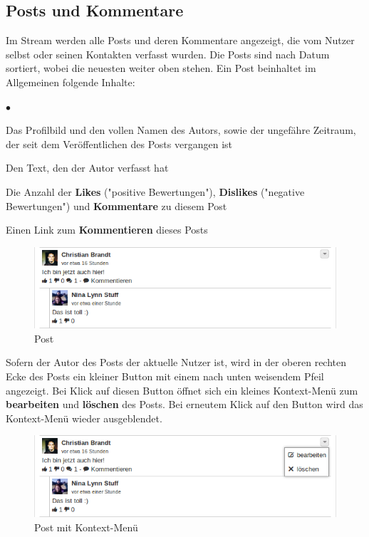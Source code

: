 \documentclass[10pt,a4paper]{book}
\makeatletter
\def\ScaleIfNeeded{%
\ifdim\Gin@nat@width>\linewidth
\linewidth
\else
\Gin@nat@width
\fi
}
\makeatother
\begin{document}
\subsection{Posts und Kommentare}
Im Stream werden alle Posts und deren Kommentare angezeigt, die vom Nutzer selbst oder seinen Kontakten verfasst wurden. Die Posts sind nach Datum sortiert, wobei die neuesten weiter oben stehen.
Ein Post beinhaltet im Allgemeinen folgende Inhalte:
\begin{list}{$\bullet$}{}
\item Das Profilbild und den vollen Namen des Autors, sowie der ungefähre Zeitraum, der seit dem Veröffentlichen des Posts vergangen ist
\item Den Text, den der Autor verfasst hat
\item Die Anzahl der \textbf{Likes} ("positive Bewertungen"), \textbf{Dislikes} ("negative Bewertungen") und \textbf{Kommentare} zu diesem Post
\item Einen Link zum \textbf{Kommentieren} dieses Posts
\end{list}
\begin{figure}[htbp]
\centering
\includegraphics[width=\ScaleIfNeeded]{Pictures/screen_post.png}%
\caption{Post}%
\end{figure}
Sofern der Autor des Posts der aktuelle Nutzer ist, wird in der oberen rechten Ecke des Posts ein kleiner Button mit einem nach unten weisendem Pfeil angezeigt. Bei Klick auf diesen Button öffnet sich ein kleines Kontext-Menü zum \textbf{bearbeiten} und \textbf{löschen} des Posts. Bei erneutem Klick auf den Button wird das Kontext-Menü wieder ausgeblendet.
\begin{figure}[htbp]
\centering
\includegraphics[width=\ScaleIfNeeded]{Pictures/screen_post_menu.png}%
\caption{Post mit Kontext-Menü}%
\end{figure}
\end{document}
